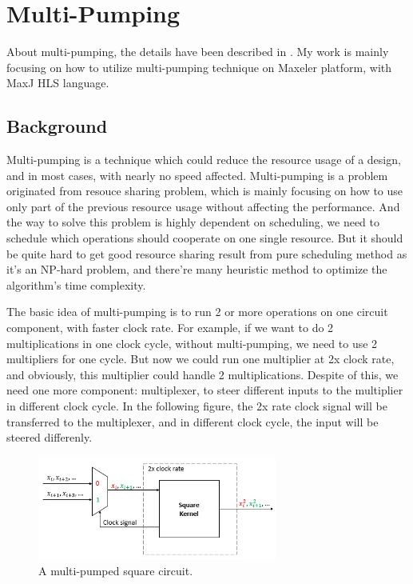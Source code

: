 \documentclass[a4paper, 10pt]{report}
\begin{document}
\tableofcontents

\chapter{Multi-Pumping}

About multi-pumping, the details have been described in \cite{Canis:2013}. My work is mainly focusing on how to utilize multi-pumping technique on Maxeler platform, with MaxJ HLS language. 

\section{Background} 
Multi-pumping is a technique which could reduce the resource usage of a design, and in most cases, with nearly no speed affected. Multi-pumping is a problem originated from resouce sharing problem, which is mainly focusing on how to use only part of the previous resource usage without affecting the performance. And the way to solve this problem is highly dependent on scheduling, we need to schedule which operations should cooperate on one single resource. But it should be quite hard to get good resource sharing result from pure scheduling method as it's an NP-hard problem, and there're many heuristic method to optimize the algorithm's time complexity. 

The basic idea of multi-pumping is to run 2 or more operations on one circuit component, with faster clock rate. For example, if we want to do 2 multiplications in one clock cycle, without multi-pumping, we need to use 2 multipliers for one cycle. But now we could run one multiplier at 2x clock rate, and obviously, this multiplier could handle 2 multiplications. Despite of this, we 
need one more component: multiplexer, to steer different inputs to the multiplier in different clock cycle. In the following figure, the 2x rate clock signal will be transferred to the multiplexer, and in different clock cycle, the input will be steered differenly. 

\begin{figure}[h!]
  \caption{A multi-pumped square circuit.}
  \centering
    \includegraphics[width=0.7\textwidth]{square-mp}
\end{figure}
\end{document}

